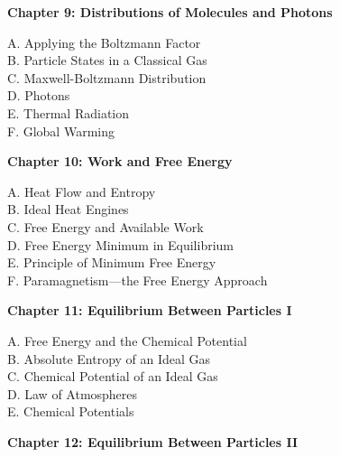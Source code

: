 \documentclass[12pt]{article}
\theoremstyle{definition} %
\theoremstyle{plain} %
\begin{document}
\vspace{1em}

\noindent \textbf{Chapter 9: Distributions of Molecules and Photons}

\noindent A. Applying the Boltzmann Factor \\
\noindent B. Particle States in a Classical Gas \\
\noindent C. Maxwell-Boltzmann Distribution \\
\noindent D. Photons \\
\noindent E. Thermal Radiation \\
\noindent F. Global Warming 

\vspace{1em}

\noindent \textbf{Chapter 10: Work and Free Energy}

\noindent A. Heat Flow and Entropy \\
\noindent B. Ideal Heat Engines \\
\noindent C. Free Energy and Available Work \\
\noindent D. Free Energy Minimum in Equilibrium \\
\noindent E. Principle of Minimum Free Energy \\
\noindent F. Paramagnetism---the Free Energy Approach 

\vspace{1em}

\noindent \textbf{Chapter 11: Equilibrium Between Particles I}

\noindent A. Free Energy and the Chemical Potential \\
\noindent B. Absolute Entropy of an Ideal Gas \\
\noindent C. Chemical Potential of an Ideal Gas \\
\noindent D. Law of Atmospheres \\
\noindent E. Chemical Potentials 

\vspace{1em}

\noindent \textbf{Chapter 12: Equilibrium Between Particles II}
\end{document}
